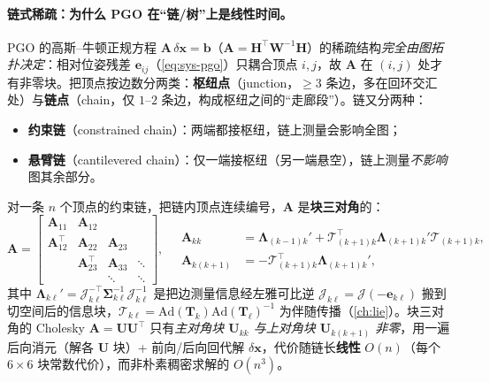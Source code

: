 \paragraph{链式稀疏：为什么 PGO 在“链/树”上是线性时间。}
PGO 的高斯--牛顿正规方程 $\mathbf{A}\,\delta\mathbf{x}=\mathbf{b}$（$\mathbf{A}=\mathbf{H}^\top\mathbf{W}^{-1}\mathbf{H}$）的稀疏结构\emph{完全由图拓扑决定}：相对位姿残差 $\mathbf{e}_{ij}$（\cref{eq:sys-pgo}）只耦合顶点 $i,j$，故 $\mathbf{A}$ 在 $(i,j)$ 处才有非零块。把顶点按边数分两类：\textbf{枢纽点}（junction，$\ge3$ 条边，多在回环交汇处）与\textbf{链点}（chain，仅 $1$--$2$ 条边，构成枢纽之间的“走廊段”）。链又分两种：
\begin{itemize}
  \item \textbf{约束链}（constrained chain）：两端都接枢纽，链上测量会影响全图；
  \item \textbf{悬臂链}（cantilevered chain）：仅一端接枢纽（另一端悬空），链上测量\emph{不影响}图其余部分。
\end{itemize}
对一条 $n$ 个顶点的约束链，把链内顶点连续编号，$\mathbf{A}$ 是\textbf{块三对角}的：
\begin{equation}
  \mathbf{A}=\begin{bmatrix}
  \mathbf{A}_{11} & \mathbf{A}_{12} & & \\
  \mathbf{A}_{12}^\top & \mathbf{A}_{22} & \mathbf{A}_{23} & \\
  & \mathbf{A}_{23}^\top & \mathbf{A}_{33} & \ddots\\
  & & \ddots & \ddots
  \end{bmatrix},\quad
  \begin{aligned}
  \mathbf{A}_{kk}&=\boldsymbol{\Lambda}_{(k-1)k}'+\boldsymbol{\mathcal{T}}_{(k+1)k}^\top\boldsymbol{\Lambda}_{(k+1)k}'\boldsymbol{\mathcal{T}}_{(k+1)k},\\
  \mathbf{A}_{k(k+1)}&=-\boldsymbol{\mathcal{T}}_{(k+1)k}^\top\boldsymbol{\Lambda}_{(k+1)k}',
  \end{aligned}
  \label{eq:sys-pgo-tridiag}
\end{equation}
其中 $\boldsymbol{\Lambda}_{k\ell}'=\boldsymbol{\mathcal{J}}_{k\ell}^{-\top}\boldsymbol{\Sigma}_{k\ell}^{-1}\boldsymbol{\mathcal{J}}_{k\ell}^{-1}$ 是把边测量信息经左雅可比逆 $\boldsymbol{\mathcal{J}}_{k\ell}=\boldsymbol{\mathcal{J}}(-\mathbf{e}_{k\ell})$ 搬到切空间后的信息块，$\boldsymbol{\mathcal{T}}_{k\ell}=\mathrm{Ad}(\mathbf{T}_k)\mathrm{Ad}(\mathbf{T}_\ell)^{-1}$ 为伴随传播（\cref{ch:lie}）。块三对角的 Cholesky $\mathbf{A}=\mathbf{U}\mathbf{U}^\top$ 只有\emph{主对角块 $\mathbf{U}_{kk}$ 与上对角块 $\mathbf{U}_{k(k+1)}$ 非零}，用一遍后向消元（解各 $\mathbf{U}$ 块）+ 前向/后向回代解 $\delta\mathbf{x}$，代价随链长\textbf{线性} $O(n)$（每个 $6\times6$ 块常数代价），而非朴素稠密求解的 $O(n^3)$。

